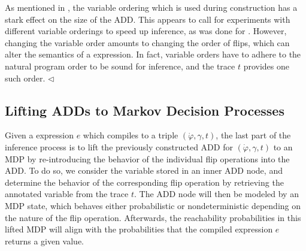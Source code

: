 \begin{remark}
	As mentioned in , the variable ordering which is used during construction has a stark effect on the size of the ADD.
	This appears to call for experiments with different variable orderings to speed up inference, as was done for \DICE \cite{cheng2021flip}.
	However, changing the variable order amounts to changing the order of flips, which can alter the semantics of a \NDICE expression.
	In fact, variable orders have to adhere to the natural program order to be sound for inference, and the trace $t$ provides one such order. 
	\hfill $\triangleleft$
\end{remark}

\subsection{Lifting ADDs to Markov Decision Processes}\label{sec:MDP_inf}

Given a \NDICE expression $e$ which compiles to a triple $(\dot{\varphi}, \gamma, t)$, the last part of the inference process is to lift the previously constructed ADD for $(\dot{\varphi}, \gamma, t)$ to an MDP by re-introducing the behavior of the individual flip operations into the ADD.
To do so, we consider the variable stored in an inner ADD node, and determine the behavior of the corresponding flip operation by retrieving the annotated variable from the trace $t$.
The ADD node will then be modeled by an MDP state, which behaves either probabilistic or nondeterministic depending on the nature of the flip operation.
Afterwards, the reachability probabilities in this lifted MDP will align with the probabilities that the compiled expression $e$ returns a given value.

